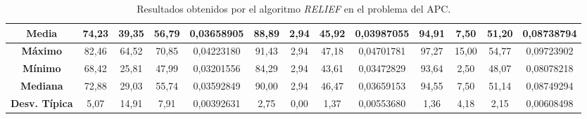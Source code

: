 \documentclass[11pt,a4paper]{article}
\begin{document}
\begin{table}[H]
{\begin{tabular}{c|c|c|c|c|c|c|c|c|c|c|c|c|}
\multicolumn{1}{|c|}{\textbf{Media}}        & 74,23                      & 39,35                   & 56,79                  & 0,03658905 & 88,89                      & 2,94                    & 45,92                  & 0,03987055 & 94,91                      & 7,50                    & 51,20                  & 0,08738794 \\ \hline
\multicolumn{1}{|c|}{\textbf{Máximo}}       & 82,46                      & 64,52                   & 70,85                  & 0,04223180 & 91,43                      & 2,94                    & 47,18                  & 0,04701781 & 97,27                      & 15,00                   & 54,77                  & 0,09723902 \\ \hline
\multicolumn{1}{|c|}{\textbf{Mínimo}}       & 68,42                      & 25,81                   & 47,99                  & 0,03201556 & 84,29                      & 2,94                    & 43,61                  & 0,03472829 & 93,64                      & 2,50                    & 48,07                  & 0,08078218 \\ \hline
\multicolumn{1}{|c|}{\textbf{Mediana}}      & 72,88                      & 29,03                   & 55,74                  & 0,03592849 & 90,00                      & 2,94                    & 46,47                  & 0,03659153 & 94,55                      & 7,50                    & 51,14                  & 0,08749294 \\ \hline
\multicolumn{1}{|c|}{\textbf{Desv. Típica}} & 5,07                       & 14,91                   & 7,91                   & 0,00392631 & 2,75                       & 0,00                    & 1,37                   & 0,00553680 & 1,36                       & 4,18                    & 2,15                   & 0,00608498 \\ \hline
\end{tabular}
}%
\caption{Resultados obtenidos por el algoritmo \textit{RELIEF} en el problema del APC.}
\end{table}
\end{document}
